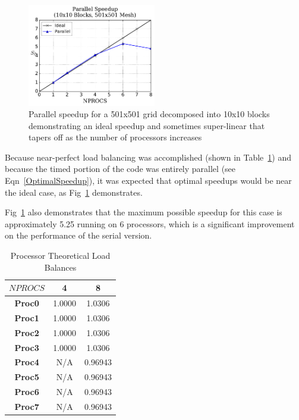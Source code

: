 \documentclass[twocolumn,10pt]{asme2ej}
\begin{document}
\begin{figure}[htb]
\begin{center}
\includegraphics[width=0.5\textwidth]{../Results/Speedup.pdf}
\caption{Parallel speedup for a 501x501 grid decomposed into 10x10 blocks demonstrating an ideal speedup and sometimes super-linear that tapers off as the number of processors increases}
\label{Speedup}
\end{center}
\end{figure}

Because near-perfect load balancing was accomplished (shown in Table~\ref{Load}) and because the timed portion of the code was entirely parallel (see Eqn~\ref{OptimalSpeedup}), it was expected that optimal speedups would be near the ideal case, as Fig~\ref{Speedup} demonstrates.

Fig~\ref{Speedup} also demonstrates that the maximum possible speedup for this case is approximately 5.25 running on 6 processors, which is a significant improvement on the performance of the serial version.

\vspace{-1.8em}
\begin{table}[htb]
\begin{center}
\caption{Processor Theoretical Load Balances}
\begin{tabular}{|c | c c|}
\hline
\textbf{$NPROCS$} & 4   & 8     \\
\hline
\textbf{Proc0}    & 1.0000 & 1.0306 \\
\textbf{Proc1}    & 1.0000 & 1.0306 \\
\textbf{Proc2}    & 1.0000 & 1.0306 \\
\textbf{Proc3}    & 1.0000 & 1.0306 \\
\textbf{Proc4}    & N/A    & 0.96943 \\
\textbf{Proc5}    & N/A    & 0.96943 \\
\textbf{Proc6}    & N/A    & 0.96943 \\
\textbf{Proc7}    & N/A    & 0.96943 \\
\hline
\end{tabular}
\label{Load}
\end{center}
\end{table}
\vspace{-2.3em}
\end{document}
